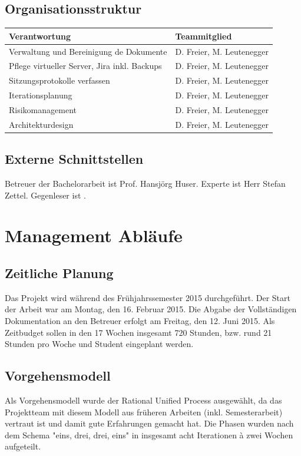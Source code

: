 \subsection*{Organisationsstruktur}
\begin{tabularx}{\textwidth}{Xl}
	\textbf{Verantwortung}	& \textbf{Teammitglied} \\
	\hline
	Verwaltung und Bereinigung de Dokumente		& D. Freier, M. Leutenegger \\ \hline
	Pflege virtueller Server, Jira inkl. Backups	& D. Freier, M. Leutenegger \\ \hline
	Sitzungsprotokolle verfassen					& D. Freier, M. Leutenegger \\ \hline
	Iterationsplanung							& D. Freier, M. Leutenegger \\ \hline
	Risikomanagement								& D. Freier, M. Leutenegger \\ \hline
	Architekturdesign							& D. Freier, M. Leutenegger \\ \hline
\end{tabularx}

\subsection*{Externe Schnittstellen}
Betreuer der Bachelorarbeit ist Prof. Hansjörg Huser. Experte ist Herr Stefan Zettel. Gegenleser ist \tbd .
\pagebreak

\section*{Management Abläufe}
\subsection*{Zeitliche Planung}
Das Projekt wird während des Frühjahrssemester 2015 durchgeführt. Der Start der Arbeit war am Montag, den 16. Februar 2015. Die Abgabe der Vollständigen Dokumentation an den Betreuer erfolgt am Freitag, den 12. Juni 2015. Als Zeitbudget sollen in den 17 Wochen insgesamt 720 Stunden, bzw. rund 21 Stunden pro Woche und Student eingeplant werden.

\subsection*{Vorgehensmodell}
Als Vorgehensmodell wurde der Rational Unified Process ausgewählt, da das Projektteam mit diesem Modell aus früheren Arbeiten (inkl. Semesterarbeit) vertraut ist und damit gute Erfahrungen gemacht hat. Die Phasen wurden nach dem Schema "eins, drei, drei, eins" in insgesamt acht Iterationen à zwei Wochen aufgeteilt.

